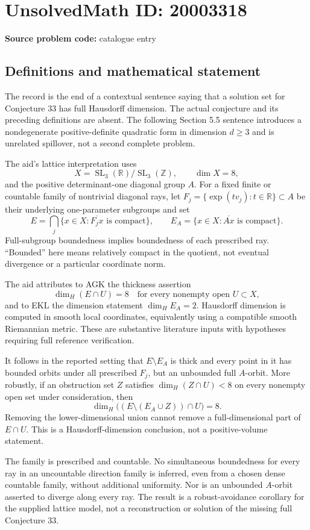 \documentclass[11pt]{article}
\newcommand{\Z}{\mathbb{Z}}
\newcommand{\R}{\mathbb{R}}
\begin{document}
\section*{UnsolvedMath ID: 20003318}
\textbf{Source problem code:} catalogue entry
\subsection{Definitions and mathematical statement}
The record is the end of a contextual sentence saying that a solution set for Conjecture 33 has full Hausdorff dimension. The actual conjecture and its preceding definitions are absent. The following Section 5.5 sentence introduces a nondegenerate positive-definite quadratic form in dimension $d\geq3$ and is unrelated spillover, not a second complete problem.

The aid's lattice interpretation uses
\[
X=\operatorname{SL}_3(\R)/\operatorname{SL}_3(\Z),\qquad\dim X=8,
\]
and the positive determinant-one diagonal group $A$. For a fixed finite or countable family of nontrivial diagonal rays, let $F_j=\{\exp(tv_j):t\in\R\}\subset A$ be their underlying one-parameter subgroups and set
\[
E=\bigcap_j\{x\in X:\overline{F_jx}\text{ is compact}\},\qquad
E_A=\{x\in X:\overline{Ax}\text{ is compact}\}.
\]
Full-subgroup boundedness implies boundedness of each prescribed ray. ``Bounded'' here means relatively compact in the quotient, not eventual divergence or a particular coordinate norm.

The aid attributes to AGK the thickness assertion
\[
\dim_H(E\cap U)=8\quad\text{for every nonempty open }U\subset X,
\]
and to EKL the dimension statement $\dim_HE_A=2$. Hausdorff dimension is computed in smooth local coordinates, equivalently using a compatible smooth Riemannian metric. These are substantive literature inputs with hypotheses requiring full reference verification.

It follows in the reported setting that $E\setminus E_A$ is thick and every point in it has bounded orbits under all prescribed $F_j$, but an unbounded full $A$-orbit. More robustly, if an obstruction set $Z$ satisfies $\dim_H(Z\cap U)<8$ on every nonempty open set under consideration, then
\[
\dim_H\bigl((E\setminus(E_A\cup Z))\cap U\bigr)=8.
\]
Removing the lower-dimensional union cannot remove a full-dimensional part of $E\cap U$. This is a Hausdorff-dimension conclusion, not a positive-volume statement.

The family is prescribed and countable. No simultaneous boundedness for every ray in an uncountable direction family is inferred, even from a chosen dense countable family, without additional uniformity. Nor is an unbounded $A$-orbit asserted to diverge along every ray. The result is a robust-avoidance corollary for the supplied lattice model, not a reconstruction or solution of the missing full Conjecture 33.
\end{document}
